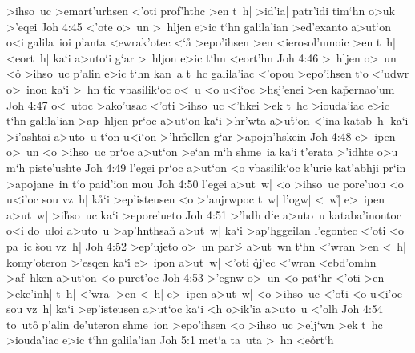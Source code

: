 >ihso~uc
>emart'urhsen
<'oti
prof'hthc
>en
t~h|
>id'ia|
patr'idi
tim`hn
o>uk
>'eqei\bibvsend
\vs Joh 4:45
<'ote
o>~un
>~hljen
e>ic
t`hn
galila'ian
>ed'exanto
a>ut`on
o<i
galila~ioi
p'anta
<ewrak'otec
<`a\r{}
>epo'ihsen
>en
<ierosol'umoic
>en
t~h|
<eort~h|
ka`i
a>uto`i
g`ar
>~hljon
e>ic
t`hn
<eort'hn\bibvsend
\vs Joh 4:46
>~hljen
o>~un
<o\r{}
>ihso~uc
p'alin
e>ic
t`hn
kan~a
t~hc
galila'iac
<'opou
>epo'ihsen
t`o
<'udwr
o>~inon
ka`i
>~hn
tic
vbasilik`oc
o<~u
<o
u<i`oc
>hsj'enei
>en
ka\r{p}ernao'um\bibvsend
{}
\vs Joh 4:47
o<~utoc
>ako'usac
<'oti
>ihso~uc
<'hkei
>ek
t~hc
>iouda'iac
e>ic
t`hn
galila'ian
>ap~hljen
pr`oc
a>ut`on
ka`i
>hr'wta
a>u\r{t}`on
<'ina
katab~h|
ka`i
>i'ashtai
a>uto~u
t`on
u<i`on
>'h\r{m}ellen
g`ar
>apojn'hskein\bibvsend
\vs Joh 4:48
e>~ipen
o>~un
<o
>ihso~uc
pr`oc
a>ut`on
>e`an
m`h
shme~ia
ka`i
t'erata
>'idhte
o>u
m`h
piste'ushte\bibvsend
\vs Joh 4:49
l'egei
pr`oc
a>ut`on
<o
vbasilik`oc
k'urie
kat'abhji
pr`in
>apojane~in
t`o
paid'ion
mou\bibvsend
\vs Joh 4:50
l'egei
a>ut~w|
<o
>ihso~uc
pore'uou
<o
u<i'oc
sou
vz~h|
k\r{a}`i
>ep'isteusen
<o
>'anjrwpoc
t~w|
l'ogw|
<~w|\r{}
e>~ipen
a>ut~w|
>i\r{h}so~uc
ka`i
>epore'ueto\bibvsend
\vs Joh 4:51
>'hdh
d`e
a>uto~u
kataba'inontoc
o<i
do~uloi
a>uto~u
>ap'hnthsan\r{}
a>ut~w|
ka`i
>ap'hggeilan
l'egontec
<'oti
<o
pa~ic
\r{s}ou
vz~h|\bibvsend
\vs Joh 4:52
>ep'ujeto
o>~un
par>\r{}
a>ut~wn
t`hn
<'wran
>en
<~h|
komy'oteron
>'esqen
ka`i\r{}
e>~ipon
a>ut~w|
<'oti
\r{q}j`ec
<'wran
<ebd'omhn
>af~hken
a>ut`on
<o
puret'oc\bibvsend
\vs Joh 4:53
>'egnw
o>~un
<o
pat`hr
<'oti
>en
>eke'inh|
t~h|
<'wra|
>en
<~h|
e>~ipen
a>ut~w|
<o
>ihso~uc
<'o\r{t}i
<o
u<i'oc
sou
vz~h|
ka`i
>ep'isteusen
a>ut`oc
ka`i
<h
o>ik'ia
a>uto~u
<'olh\bibvsend
\vs Joh 4:54
to~ut\r{o}
p'alin
de'uteron
shme~ion
>epo'ihsen
<o
>ihso~uc
>elj`wn
>ek
t~hc
>iouda'iac
e>ic
t`hn
galila'ian\bibvsend
\vs Joh 5:1
met`a
ta~uta
>~hn
<e\r{o}rt`h
